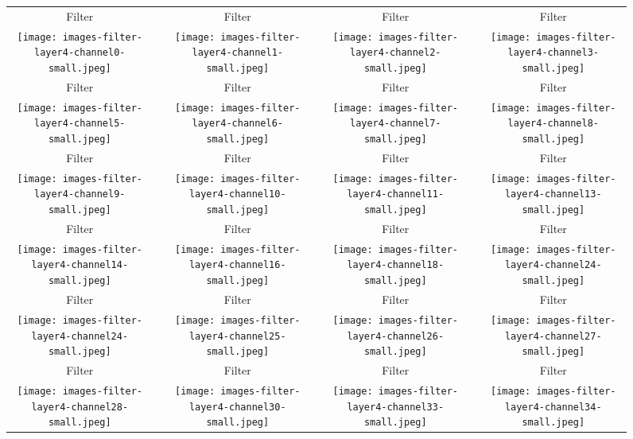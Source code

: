 \documentclass[runningheads]{llncs}
\begin{document}
\begin{figure}[t]
\centering
\begin{tabular}{ccccccc}
Filter  && Filter  && Filter  && Filter 
\\
\texttt{[image: images-filter-layer4-channel0-small.jpeg]}&&
\texttt{[image: images-filter-layer4-channel1-small.jpeg]}&&
\texttt{[image: images-filter-layer4-channel2-small.jpeg]}&&
\texttt{[image: images-filter-layer4-channel3-small.jpeg]}
\\
Filter  && Filter  && Filter  && Filter 
\\
\texttt{[image: images-filter-layer4-channel5-small.jpeg]}&&
\texttt{[image: images-filter-layer4-channel6-small.jpeg]}&&
\texttt{[image: images-filter-layer4-channel7-small.jpeg]}&&
\texttt{[image: images-filter-layer4-channel8-small.jpeg]}
\\
Filter  && Filter  && Filter  && Filter 
\\
\texttt{[image: images-filter-layer4-channel9-small.jpeg]}&&
\texttt{[image: images-filter-layer4-channel10-small.jpeg]}&&
\texttt{[image: images-filter-layer4-channel11-small.jpeg]}&&
\texttt{[image: images-filter-layer4-channel13-small.jpeg]}
\\
Filter  && Filter  && Filter  && Filter 
\\
\texttt{[image: images-filter-layer4-channel14-small.jpeg]}&&
\texttt{[image: images-filter-layer4-channel16-small.jpeg]}&&
\texttt{[image: images-filter-layer4-channel18-small.jpeg]}&&
\texttt{[image: images-filter-layer4-channel24-small.jpeg]}
\\
Filter  && Filter  && Filter  && Filter 
\\
\texttt{[image: images-filter-layer4-channel24-small.jpeg]}&&
\texttt{[image: images-filter-layer4-channel25-small.jpeg]}&&
\texttt{[image: images-filter-layer4-channel26-small.jpeg]}&&
\texttt{[image: images-filter-layer4-channel27-small.jpeg]}
\\
Filter  && Filter  && Filter  && Filter 
\\
\texttt{[image: images-filter-layer4-channel28-small.jpeg]}&&
\texttt{[image: images-filter-layer4-channel30-small.jpeg]}&&
\texttt{[image: images-filter-layer4-channel33-small.jpeg]}&&
\texttt{[image: images-filter-layer4-channel34-small.jpeg]}
\end{tabular}
\end{figure}
\end{document}
